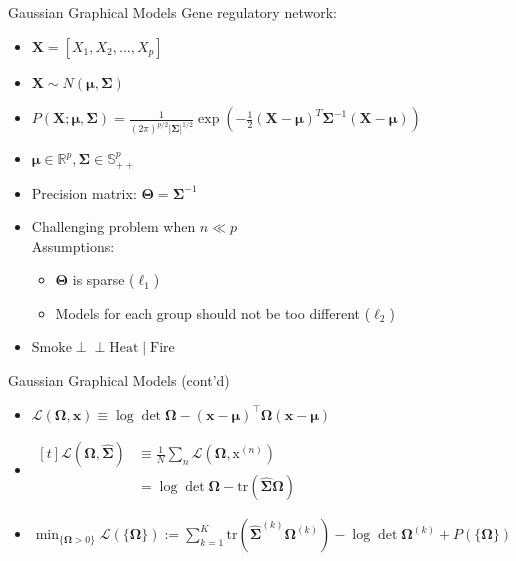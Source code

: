 \documentclass{beamer}
\def\ci{\perp\!\!\!\perp}
\begin{document}
\begin{frame}{Gaussian Graphical Models}
	Gene regulatory network:
	\begin{itemize}
		\item $\bm{X}=\left[X_{1}, X_{2}, \dots, X_{p}\right]$
		\item $\bm{X} \sim N(\bm{\mu}, \bm{\Sigma})$
		\item $P(\bm{X} ; \bm{\mu}, \bm{\Sigma})=\frac{1}{(2 \pi)^{p / 2}|\bm{\Sigma}|^{1 / 2}} \exp \left(-\frac{1}{2}(\bm{X}-\bm{\mu})^{T} \bm{\Sigma}^{-1}(\bm{X}-\bm{\mu})\right)$
		\item $\bm{\mu} \in \mathbb{R}^{p}, \boldsymbol{\Sigma} \in \mathbb{S}_{++}^{p}$
		\item Precision matrix: $\bm{\Theta} = \bm{\Sigma}^{-1}$
		\item Challenging problem when $n \ll p$\\
		      Assumptions:
		      \begin{itemize}
			      \item $\bm{\Theta}$ is sparse ($\ell_{1}$)
			      \item Models for each group should not be too different ($\ell_{2}$)
		      \end{itemize}
		\item $\text{Smoke} \ci \text{Heat} \mid \text{Fire}$
	\end{itemize}
\end{frame}
\begin{frame}{Gaussian Graphical Models (cont'd)}
  \begin{itemize}
	  \item $\mathcal{L}(\mathbf{\Omega}, \mathbf{x}) \equiv \log \operatorname{det}
	\boldsymbol{\Omega}-(\mathbf{x}-\boldsymbol{\mu})^{\top}
	\boldsymbol{\Omega}(\mathbf{x}-\boldsymbol{\mu})$
	  \item $\begin{aligned}[t] \mathcal{L}(\mathbf{\Omega},
		\mathbf{\widehat{\Sigma}}) & \equiv \frac{1}{N} \sum_{n}
		\mathcal{L}\left(\mathbf{\Omega}, \mathrm{x}^{(n)}\right) \\ &=\log
		\operatorname{det}
		\mathbf{\Omega}-\text{tr}(\widehat{\mathbf{\Sigma}}\mathbf{\Omega}) \end{aligned}$
	  \item $\min _{\{\mathbf{\Omega}>0\}} \mathcal{L}(\{\mathbf{\Omega}\})
		:= \sum _{ k=1  }^{ K }{ \text{tr}(\mathbf{\widehat{\Sigma}}^{(k)}\mathbf{\Omega}^{(k)})-\log
		\operatorname{det} \mathbf{\Omega}^{(k)}+P(\{\mathbf{\Omega}\})  }$
  \end{itemize}

\end{frame}
\end{document}
